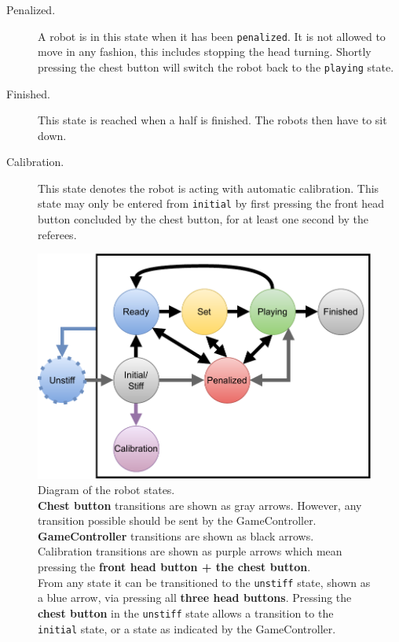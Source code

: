 \begin{description}
  \item[Penalized.] A robot is in this state when it has been \texttt{penalized}. It is not allowed to move in any fashion,  this includes stopping the head turning. Shortly pressing the chest button will switch the robot back to the \texttt{playing} state.

  \item[Finished.] This state is reached when a half is finished. The robots then have to sit down.

  \item[Calibration.] This state denotes the robot is acting with automatic calibration. This state may only be entered from \texttt{initial} by first pressing the front head button concluded by the chest button, for at least one second by the referees.


\end{description}

\begin{figure}[t]
	\centerline{\includegraphics[width=0.9\columnwidth]{figs/states_new.pdf}}
	\caption{Diagram of the robot states.
    \\\textbf{Chest button} transitions are shown as gray arrows. However, any transition possible should be sent by the GameController.
    \\\textbf{GameController} transitions are shown as black arrows.
    \\Calibration transitions are shown as purple arrows which mean pressing the \textbf{front head button + the chest button}.
    \\From any state it can be transitioned to the \texttt{unstiff} state, shown as a blue arrow, via pressing all \textbf{three head buttons}. Pressing the \textbf{chest button} in the \texttt{unstiff} state allows a transition to the \texttt{initial} state, or a state as indicated by the GameController.}
	\label{fig:robot_states}
\end{figure}

